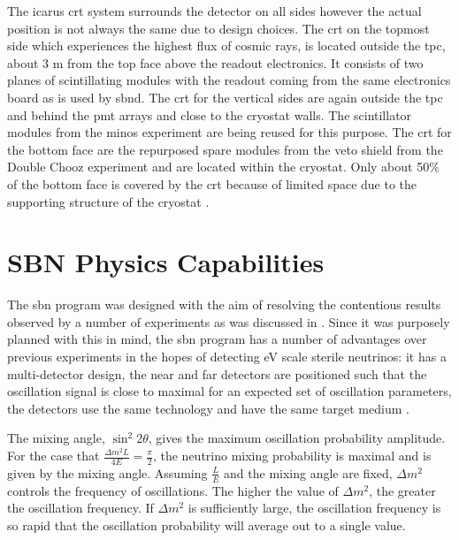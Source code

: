 The \gls{icarus} \gls{crt} system surrounds the detector on all sides however the actual position is not always the same due to design choices. The \gls{crt} on the topmost side which experiences the highest flux of cosmic rays, is located outside the \gls{tpc}, about 3 m from the top face above the readout electronics. It consists of two planes of scintillating modules with the readout coming from the same electronics board as is used by \gls{sbnd}.
The \gls{crt} for the vertical sides are again outside the \gls{tpc} and behind the \gls{pmt} arrays and close to the cryostat walls. The scintillator modules from the \gls{minos} experiment are being reused for this purpose. The \gls{crt} for the bottom face are the repurposed spare modules from the veto shield from the Double Chooz experiment and are located within the cryostat. Only about 50\% of the bottom face is covered by the \gls{crt} because of limited space due to the supporting structure of the cryostat \cite{SBN_Proposal}\cite{ICARUS_CRT}.


\section{SBN Physics Capabilities}\label{sec:sbn_physics_capabilities}

The \gls{sbn} program was designed with the aim of resolving the contentious results observed by a number of experiments as was discussed in . Since it was purposely planned with this in mind, the \gls{sbn} program has a number of advantages over previous experiments in the hopes of detecting eV scale sterile neutrinos: it has a multi-detector design, the near and far detectors are positioned such that the oscillation signal is close to maximal for an expected set of oscillation parameters, the detectors use the same technology and have the same target medium \cite{SBN_paper}. 

The mixing angle, $\sin^2{2\theta}$, gives the maximum oscillation probability amplitude. For the case that $\frac{\Delta m^2 L}{4E} = \frac{\pi}{2}$, the neutrino mixing probability is maximal and is given by the mixing angle. Assuming $\frac{L}{E}$ and the mixing angle are fixed, $\Delta m^2$ controls the frequency of oscillations. The higher the value of $\Delta m^2$, the greater the oscillation frequency. If $\Delta m^2$ is sufficiently large, the oscillation frequency is so rapid that the oscillation probability will average out to a single value. 

